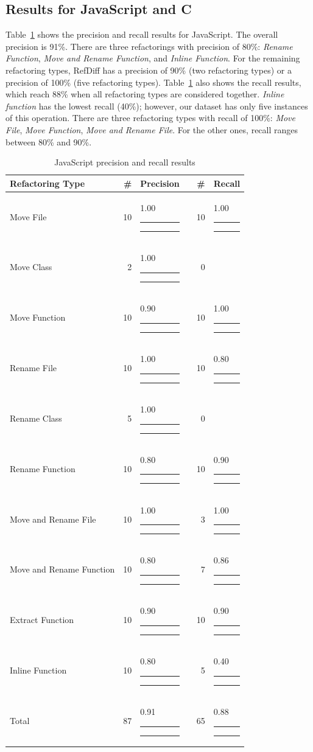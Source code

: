 \documentclass[10pt,journal,compsoc]{IEEEtran}
\newcommand\xbar[1]{#1 {\color{darkgray} \rule{\dimexpr #1pt * 16}{5.5pt}}{\color{lightgray} \rule{\dimexpr 16pt - (#1pt * 16)}{5.5pt}}}
\begin{document}
\subsection{Results for JavaScript and C}
\label{sec:eval:js:c:results}

Table~\ref{TabResultJs} shows the precision and recall results for JavaScript. The overall precision is 91\%. There are three refactorings with precision of 80\%: \textit{Rename Function}, \textit{Move and Rename Function}, and \textit{Inline Function}. For the remaining refactoring types, RefDiff has a precision of 90\% (two refactoring types) or a precision of 100\% (five refactoring types). Table~\ref{TabResultJs} also shows the recall results, which reach 88\% when all refactoring types are considered together.
\textit{Inline function} has the lowest recall (40\%); however, our dataset has only five instances of this operation. There are three refactoring types with recall of 100\%: \textit{Move File}, \textit{Move Function}, \textit{Move and Rename File}. For the other ones, recall ranges between 80\% and 90\%.


\begin{table}[htbp]
\renewcommand{\arraystretch}{1.2}
\caption{JavaScript precision and recall results}
\label{TabResultJs}
\centering
\begin{tabular}{@{}lrllrl@{}}
\toprule
Refactoring Type & \# & Precision & & \# & Recall\\
\midrule
Move File & 10 & \xbar{1.00} & & 10 & \xbar{1.00} \\
Move Class & 2 & \xbar{1.00} & & 0 & \\
Move Function & 10 & \xbar{0.90} & & 10 & \xbar{1.00} \\
Rename File & 10 & \xbar{1.00} & & 10 & \xbar{0.80} \\
Rename Class & 5 & \xbar{1.00} & & 0 & \\
Rename Function & 10 & \xbar{0.80} & & 10 & \xbar{0.90} \\
Move and Rename File & 10 & \xbar{1.00} & & 3 & \xbar{1.00} \\
Move and Rename Function & 10 & \xbar{0.80} & & 7 & \xbar{0.86} \\
Extract Function & 10 & \xbar{0.90} & & 10 & \xbar{0.90} \\
Inline Function & 10 & \xbar{0.80} & & 5 & \xbar{0.40} \\
\addlinespace
Total & 87 & \xbar{0.91} & & 65 & \xbar{0.88} \\
\bottomrule
\end{tabular}
\end{table}
\end{document}

